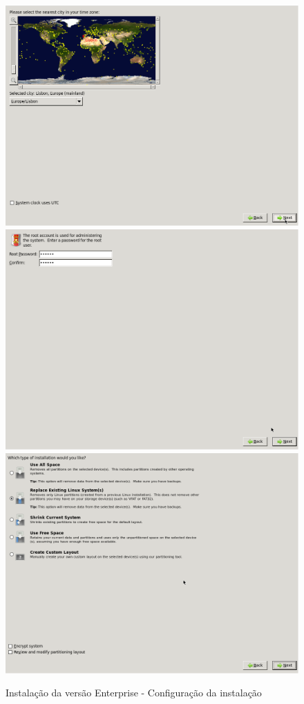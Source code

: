 \begin{figure}[H]
\begin{center}
	\includegraphics[scale=0.2]{screenshots/install/nuxis/wizard_install_05.png}
	\includegraphics[scale=0.2]{screenshots/install/nuxis/wizard_install_06.png}
	\includegraphics[scale=0.2]{screenshots/install/nuxis/wizard_install_07.png}
    \caption{Instalação da versão Enterprise - Configuração da instalação}
	\label{fig:installation_enterprise_02}
	\end{center}
\end{figure}
